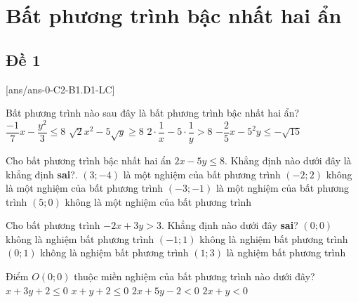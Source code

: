 \section{Bất phương trình bậc nhất hai ẩn}

\subsection{Đề 1}
 [ans/ans-0-C2-B1.D1-LC]
 \caulc
  \begin{ex}%
 	Bất phương trình nào sau đây là bất phương trình bậc nhất hai ẩn?
 	\choice
 	{$\dfrac{-1}{7}x-\dfrac{y^2}{3} \le 8$ }
 	{$\sqrt{2} x^2-5 \sqrt{y} \ge 8$}
 	{$2 \cdot \dfrac{1}{x}-5\cdot \dfrac{1}{y}>8$}
 	{\True $-\dfrac{2}{5} x-5^2 y \leq-\sqrt{15}$}
 \end{ex}
 
 \begin{ex}%
 	Cho bất phương trình bậc nhất hai ẩn $2 x-5 y \leq 8$. Khẳng định nào dưới đây là khẳng định \textbf{sai}?.
 	\choice
 	{$(3 ;-4)$ là một nghiệm của bất phương trình}
 	{\True $(-2 ; 2)$ không là một nghiệm của bất phương trình}
 	{ $(-3 ;-1)$ là một nghiệm của bất phương trình}
 	{ $(5 ; 0)$ không là một nghiệm của bất phương trình}
 \end{ex}
 
 \begin{ex}%
 	Cho bất phương trình $-2 x+3 y>3$. Khẳng định nào dưới đây \textbf{sai}?
 	\choice 
 	{$(0 ; 0)$ không là nghiệm bất phương trình}
 	{\True $(-1 ; 1)$ không là nghiệm bất phương trình}
 	{$(0 ; 1)$ không là nghiệm bất phương trình}
 	{ $(1 ; 3)$ là nghiệm bất phương trình}
 \end{ex}
 
 \begin{ex}%
 	Điểm $O(0 ; 0)$ thuộc miền nghiệm của bất phương trình nào dưới đây?
 	\choice
 	{$x+3 y+2 \le 0$}
 	{$x+y+2 \le 0$}
 	{\True $2 x+5 y-2<0$}
 	{$2 x+y<0$}
 \end{ex}
 
